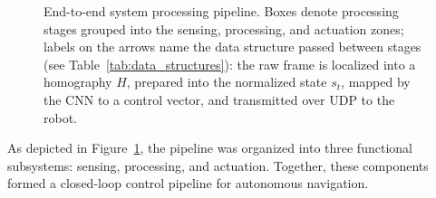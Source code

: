 \begin{figure}[H]
{%
    }
    \caption{End-to-end system processing pipeline. Boxes denote processing stages grouped into the sensing, processing, and actuation zones; labels on the arrows name the data structure passed between stages (see Table~\ref{tab:data_structures}): the raw frame is localized into a homography $H$, prepared into the normalized state $s_t$, mapped by the CNN to a control vector, and transmitted over UDP to the robot.}
    \label{fig:3.1}
\end{figure}

As depicted in Figure~\ref{fig:3.1}, the pipeline was organized into three functional subsystems: sensing, processing, and actuation. Together, these components formed a closed-loop control pipeline for autonomous navigation.

